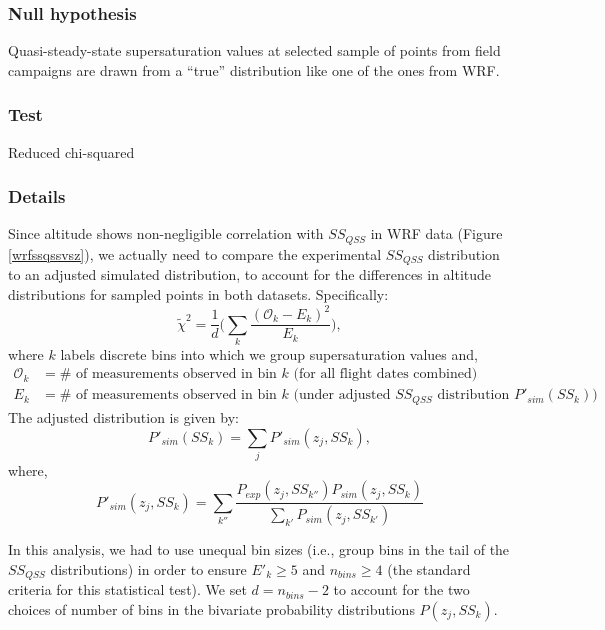 \documentclass{article}
\begin{document}
\subsubsection{Null hypothesis}
Quasi-steady-state supersaturation values at selected sample of points from field campaigns are drawn from a ``true'' distribution like one of the ones from WRF. 
\subsubsection{Test}
Reduced chi-squared
\subsubsection{Details}
Since altitude shows non-negligible correlation with $SS_{QSS}$ in WRF data (Figure \ref{wrfssqssvsz}), we actually need to compare the experimental $SS_{QSS}$ distribution to an adjusted simulated distribution, to account for the differences in altitude distributions for sampled points in both datasets. Specifically:
\begin{equation}
\tilde\chi^2 = \frac{1}{d}\Big(\sum_{k} \frac{(\mathcal{O}_k - E_k)^2}{E_k}\Big),
\end{equation}
where $k$ labels discrete bins into which we group supersaturation values and,
\begin{align}
\mathcal{O}_k &= \text{# of measurements observed in bin $k$ (for all flight dates combined)}\nonumber\\
E_k &= \text{# of measurements observed in bin $k$ (under adjusted $SS_{QSS}$ distribution $P'_{sim}(SS_k)$)}\nonumber
\end{align}
The adjusted distribution is given by:
\begin{equation}
P'_{sim}(SS_k) = \sum_{j} P'_{sim}(z_j, SS_k),
\end{equation}
where,
\begin{equation}
P'_{sim}(z_j, SS_k) = \sum_{k''}\frac{P_{exp}(z_j, SS_{k''})P_{sim}(z_j, SS_k)}{\sum_{k'}P_{sim}(z_j, SS_{k'})}
\end{equation}

In this analysis, we had to use unequal bin sizes (i.e., group bins in the tail of the $SS_{QSS}$ distributions) in order to ensure $E'_k \geq 5$ and $n_{bins} \geq 4$ (the standard criteria for this statistical test). We set $d = n_{bins} - 2$ to account for the two choices of number of bins in the bivariate probability distributions $P(z_j, SS_k)$.
\end{document}
